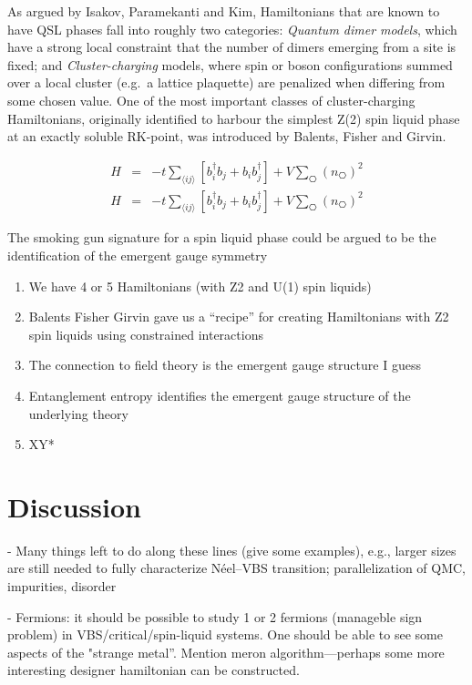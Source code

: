 \documentclass[aps,prb,groupedaddress,twocolumn]{revtex4}
\begin{document}
As argued by Isakov, Paramekanti and Kim,\cite{Isakov2}  Hamiltonians that are known to have QSL phases fall into roughly two categories:
{\it Quantum dimer models}, which have a strong local constraint that the number of dimers emerging from a site is fixed; and
{\it Cluster-charging} models, where spin or boson configurations summed over a local cluster (e.g.~a lattice plaquette) are penalized when differing from some chosen value.
One of the most important classes of cluster-charging Hamiltonians, originally identified to harbour the simplest Z(2) spin liquid phase at an exactly soluble RK-point, was introduced by Balents, Fisher and Girvin.\cite{BFG}  

\begin{eqnarray}
H &=& -t \sum_{\langle ij \rangle} [b^{\dagger}_i b_j + b_i b^{\dagger}_j] + V \sum_{\hexagon} (n_{\hexagon})^2 \\
H &=& -t \sum_{\langle ij \rangle} [b^{\dagger}_i b_j + b_i b^{\dagger}_j] + V \sum_{\hexagon} (n_{\hexagon})^2 
\end{eqnarray}




The smoking gun signature for a spin liquid phase could be argued to be the identification of the emergent gauge symmetry


\begin{enumerate}
\item We have 4 or 5 Hamiltonians (with Z2 \cite{Isakov1} and U(1) spin liquids)
\item Balents Fisher Girvin gave us a ``recipe'' for creating Hamiltonians with Z2 spin liquids using constrained interactions
\item The connection to field theory is the emergent gauge structure I guess
\item Entanglement entropy identifies the emergent gauge structure of the underlying theory
\item XY*
\end{enumerate}

\section{Discussion}
- Many things left to do along these lines (give some examples), e.g., larger sizes are still needed
to fully characterize N\'eel--VBS transition; parallelization of QMC, impurities, disorder

- Fermions: it should be possible to study 1 or 2 fermions (manageble sign problem) in 
VBS/critical/spin-liquid systems. One should be able to see some aspects of the "strange metal''.
Mention meron algorithm---perhaps some more interesting designer hamiltonian can be constructed.
\end{document}
